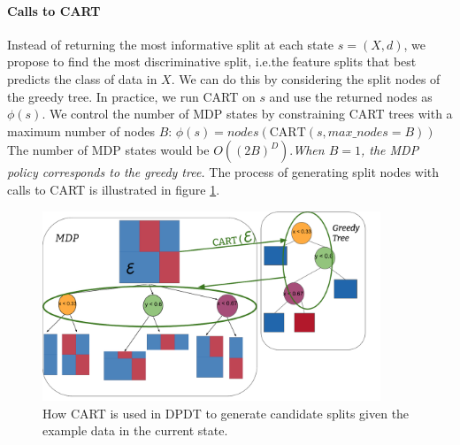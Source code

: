 \paragraph{Calls to CART}\label{cart-heuristic} Instead of returning the most informative split at each state $s=(X,d)$, we propose to find the most discriminative split, i.e.\@ the feature splits that best predicts the class of data in $X$.
We can do this by considering the split nodes of the greedy tree. In practice, we run CART on $s$ and use the returned nodes as $\phi(s)$. We control the number of MDP states by constraining CART trees with a maximum number of nodes $B$: $\phi(s) = nodes(\text{CART}(s, max\_nodes=B))$
The number of MDP states would be $O({(2B)}^D)$.\textit{When $B=1$, the MDP policy corresponds to the greedy tree.} The process of generating split nodes with calls to CART is illustrated in figure \ref{fig:schema-dpdt}.

\begin{figure}
      \centering
      \includegraphics[trim={0 0cm 0 0},clip,width=0.9\textwidth]{images/figures/schematic_cart_node_select.pdf}
      \caption{How CART is used in DPDT to generate candidate splits given the example data in the current state.}\label{fig:schema-dpdt}
\end{figure}



